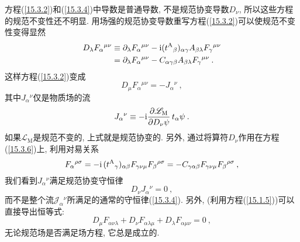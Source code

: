 方程(\ref{15.3.2})和(\ref{15.3.4})中导数是普通导数, 不是规范协变导数$D_{\nu}$, 所以这些方程的规范不变性还不明显. 
用场强的规范协变导数重写方程(\ref{15.3.2})可以使规范不变性变得显然
\begin{align}
D_{\lambda} F_{\alpha}{}^{\mu\nu}& \equiv \partial _{\lambda} F_{\alpha}{}^{\mu\nu} - \mathrm{i} (t^{\text{A}}{}_{\beta})_{\alpha\gamma}A_{\beta \lambda} F_{\gamma}{}^{\mu\nu}  \nonumber \\
        & = \partial _{\lambda}F_{\alpha}{}^{\mu\nu} - C_{\alpha \gamma \beta} A_{\beta\lambda} F_{\gamma}{}^{\mu\nu} \:.  \label{15.3.5}
\end{align}
这样方程(\ref{15.3.2})变成
\begin{equation}
D_{\mu} F_{\alpha}{}^{\mu\nu} = -J_{\alpha}{}^{\nu} \:,  \label{15.3.6}
\end{equation}
其中$J_{\alpha}{}^{\nu}$仅是物质场的流
\begin{equation}
J_{\alpha}{}^{\nu} \equiv -\mathrm{i} \frac{\partial \mathscr{L}_{\mathrm{M}}}{\partial D_{\nu} \psi}\, t_{\alpha}\psi \:.  \label{15.3.7}
\end{equation}
如果$\mathscr{L}_{\mathrm{M}}$是规范不变的, 上式就是规范协变的. 另外, 通过将算符$D_{\nu}$作用在方程(\ref{15.3.6})上, 利用对易关系
\begin{equation*}
[D_{\nu},D_{\mu}]F_{\alpha}{}^{\rho \sigma}
 = -\mi \, (t^{\text{A}}{}_{\gamma})_{\alpha\beta} F_{\gamma\nu\mu} F_{\beta}{}^{\rho \sigma}
 = -C_{\gamma\alpha\beta}F_{\gamma\nu\mu}F_{\beta}{}^{\rho\sigma} \:, 
\end{equation*}
我们看到$J_{\alpha}{}^{\nu}$满足规范协变守恒律
\begin{equation}
D_{\nu} J_{\alpha}{}^{\nu} = 0 \:,  \label{15.3.8}
\end{equation}
而不是整个流$\mathscr{J}_{\alpha}{}^{\nu}$所满足的通常的守恒律(\ref{15.3.4}). 另外, (利用方程(\ref{15.1.5}))可以直接导出恒等式:
\begin{equation}
D_{\mu} F_{\alpha\nu\lambda} + D_{\nu} F_{\alpha\lambda\mu} + D_{\lambda}F_{\alpha\mu\nu}=0 \:,  \label{15.3.9}
\end{equation}
无论规范场是否满足场方程, 它总是成立的.

